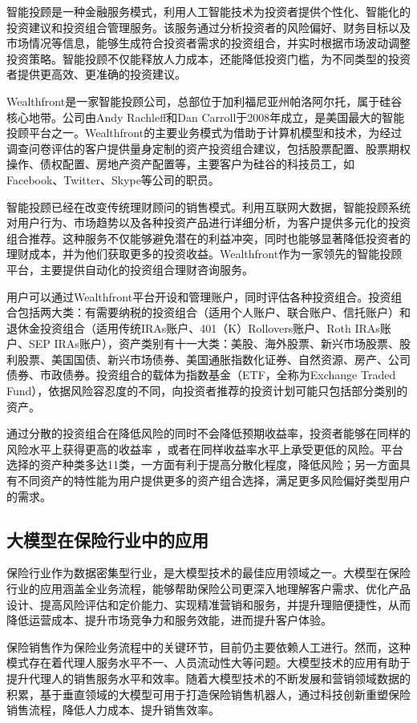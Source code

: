 智能投顾是一种金融服务模式，利用人工智能技术为投资者提供个性化、智能化的投资建议和投资组合管理服务。该服务通过分析投资者的风险偏好、财务目标以及市场情况等信息，能够生成符合投资者需求的投资组合，并实时根据市场波动调整投资策略。智能投顾不仅能释放人力成本，还能降低投资门槛，为不同类型的投资者提供更高效、更准确的投资建议。

Wealthfront是一家智能投顾公司，总部位于加利福尼亚州帕洛阿尔托，属于硅谷核心地带。公司由Andy Rachleff和Dan Carroll于2008年成立，是美国最大的智能投顾平台之一。Wealthfront的主要业务模式为借助于计算机模型和技术，为经过调查问卷评估的客户提供量身定制的资产投资组合建议，包括股票配置、股票期权操作、债权配置、房地产资产配置等，主要客户为硅谷的科技员工，如Facebook、Twitter、Skype等公司的职员。

智能投顾已经在改变传统理财顾问的销售模式。利用互联网大数据，智能投顾系统对用户行为、市场趋势以及各种投资产品进行详细分析，为客户提供多元化的投资组合推荐。这种服务不仅能够避免潜在的利益冲突，同时也能够显著降低投资者的理财成本，并为他们获取更多的投资收益。Wealthfront作为一家领先的智能投顾平台，主要提供自动化的投资组合理财咨询服务。

用户可以通过Wealthfront平台开设和管理账户，同时评估各种投资组合。投资组合包括两大类：有需要纳税的投资组合（适用个人账户、联合账户、信托账户）和退休金投资组合（适用传统IRAs账户、401（K）Rollovers账户、Roth IRAs账户、SEP IRAs账户），资产类别有十一大类：美股、海外股票、新兴市场股票、股利股票、美国国债、新兴市场债券、美国通胀指数化证券、自然资源、房产、公司债券、市政债券。投资组合的载体为指数基金（ETF，全称为Exchange Traded Fund），依据风险容忍度的不同，向投资者推荐的投资计划可能只包括部分类别的资产。

通过分散的投资组合在降低风险的同时不会降低预期收益率，投资者能够在同样的风险水平上获得更高的收益率 ，或者在同样收益率水平上承受更低的风险。平台选择的资产种类多达11类，一方面有利于提高分散化程度，降低风险；另一方面具有不同资产的特性能为用户提供更多的资产组合选择，满足更多风险偏好类型用户的需求。

\subsection{大模型在保险行业中的应用}

保险行业作为数据密集型行业，是大模型技术的最佳应用领域之一。大模型在保险行业的应用涵盖全业务流程，能够帮助保险公司更深入地理解客户需求、优化产品设计、提高风险评估和定价能力、实现精准营销和服务，并提升理赔便捷性，从而降低运营成本、提升市场竞争力和服务效能，进而提升客户体验。

保险销售作为保险业务流程中的关键环节，目前仍主要依赖人工进行。然而，这种模式存在着代理人服务水平不一、人员流动性大等问题。大模型技术的应用有助于提升代理人的销售服务水平和效率。随着大模型技术的不断发展和营销领域数据的积累，基于垂直领域的大模型可用于打造保险销售机器人，通过科技创新重塑保险销售流程，降低人力成本、提升销售效率。

